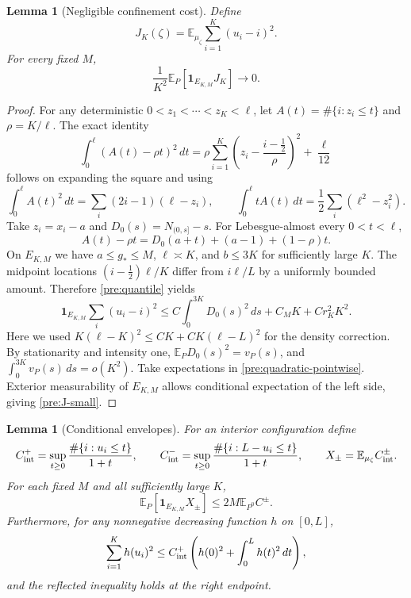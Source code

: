 \documentclass[11pt,reqno]{amsart}
\numberwithin{equation}{section}
\newtheorem{lemma}[theorem]{Lemma}
\theoremstyle{definition}
\newcommand{\E}{\mathbb E}
\newcommand{\1}{\mathbf 1}
\newcommand{\dd}{\,d}
\begin{document}
\begin{lemma}[Negligible confinement cost]\label{pre:quadratic}
Define
\begin{equation}\label{pre:J-definition}
J_K(\zeta)=\E_{\mu_\zeta}\sum_{i=1}^K(u_i-i)^2.
\end{equation}
For every fixed $M$,
\begin{equation}\label{pre:J-small}
\frac1{K^2}\E_P[\1_{E_{K,M}}J_K]\longrightarrow0.
\end{equation}
\end{lemma}

\begin{proof}
For any deterministic $0<z_1<\cdots<z_K<\ell$, let
$A(t)=\#\{i:z_i\le t\}$ and $\rho=K/\ell$. The exact identity
\begin{equation}\label{pre:quantile}
\int_0^\ell(A(t)-\rho t)^2\dd t
=\rho\sum_{i=1}^K
\left(z_i-\frac{i-\frac12}{\rho}\right)^2+\frac\ell{12}
\end{equation}
follows on expanding the square and using
\[
\int_0^\ell A(t)^2\dd t=\sum_i(2i-1)(\ell-z_i),\qquad
\int_0^\ell tA(t)\dd t=\frac12\sum_i(\ell^2-z_i^2).
\]
Take $z_i=x_i-a$ and $D_0(s)=N_{(0,s]}-s$. For Lebesgue-almost
every $0<t<\ell$,
\[
A(t)-\rho t=D_0(a+t)+(a-1)+(1-\rho)t.
\]
On $E_{K,M}$ we have $a\le g_*\le M$, $\ell\asymp K$, and $b\le3K$
for sufficiently large $K$. The midpoint locations
$(i-\frac12)\ell/K$ differ from $i\ell/L$ by a uniformly bounded
amount. Therefore \eqref{pre:quantile} yields
\begin{equation}\label{pre:quadratic-pointwise}
\1_{E_{K,M}}\sum_i(u_i-i)^2
\le C\int_0^{3K}D_0(s)^2\dd s+C_MK+Cr_K^2K^2.
\end{equation}
Here we used $K(\ell-K)^2\le C K+C K(\ell-L)^2$ for the density
correction. By stationarity and intensity one,
$\E_PD_0(s)^2=v_P(s)$, and
$\int_0^{3K}v_P(s)\dd s=o(K^2)$. Take expectations in
\eqref{pre:quadratic-pointwise}. Exterior measurability of $E_{K,M}$
allows conditional expectation of the left side, giving
\eqref{pre:J-small}.
\end{proof}

\begin{lemma}[Conditional envelopes]\label{pre:conditional-envelopes}
For an interior configuration define
\[
C_{\rm int}^+=\sup_{t\ge0}\frac{\#\{i:u_i\le t\}}{1+t},\qquad
C_{\rm int}^-=\sup_{t\ge0}\frac{\#\{i:L-u_i\le t\}}{1+t},\qquad
X_\pm=\E_{\mu_\zeta}C_{\rm int}^\pm.
\]
For each fixed $M$ and all sufficiently large $K$,
\begin{equation}\label{pre:X-bound}
\E_P[\1_{E_{K,M}}X_\pm]\le2M\E_{P^0}C^\pm.
\end{equation}
Furthermore, for any nonnegative decreasing function $h$ on $[0,L]$,
\begin{equation}\label{pre:decreasing-envelope}
\sum_{i=1}^K h(u_i)^2
\le C_{\rm int}^+\left(h(0)^2+\int_0^Lh(t)^2\dd t\right),
\end{equation}
and the reflected inequality holds at the right endpoint.
\end{lemma}
\end{document}
